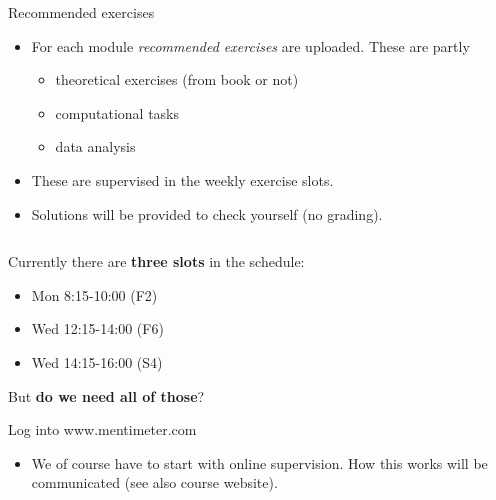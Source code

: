 \documentclass[10pt,ignorenonframetext,]{beamer}
\providecommand{\tightlist}{%
  \setlength{\itemsep}{0pt}\setlength{\parskip}{0pt}}
\begin{document}
\begin{frame}

\begin{block}{Recommended exercises}

\vspace{2mm}

\begin{itemize}
\tightlist
\item
  For each module \emph{recommended exercises} are uploaded. These are
  partly

  \begin{itemize}
  \tightlist
  \item
    theoretical exercises (from book or not)
  \item
    computational tasks
  \item
    data analysis
  \end{itemize}
\end{itemize}

\vspace{2mm}

\begin{itemize}
\tightlist
\item
  These are supervised in the weekly exercise slots.
\end{itemize}

\vspace{2mm}

\begin{itemize}
\tightlist
\item
  Solutions will be provided to check yourself (no grading).
\end{itemize}

\(~\)

Currently there are \textbf{three slots} in the schedule:

\begin{itemize}
\tightlist
\item
  Mon 8:15-10:00 (F2)
\item
  Wed 12:15-14:00 (F6)
\item
  Wed 14:15-16:00 (S4)
\end{itemize}

\vspace{2mm}

But \textbf{do we need all of those}?

Log into www.mentimeter.com

\vspace{2mm}

\begin{itemize}
\tightlist
\item
  We of course have to start with online supervision. How this works
  will be communicated (see also course website).
\end{itemize}

\end{block}

\end{frame}
\end{document}
